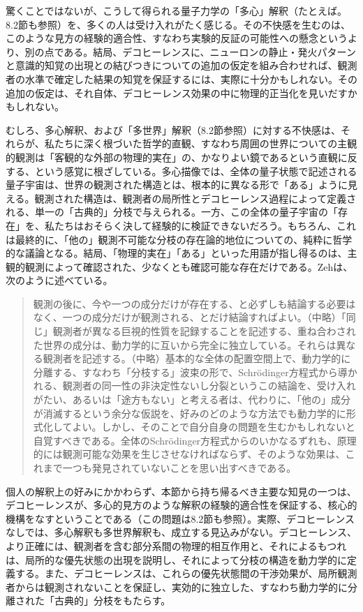 驚くことではないが、こうして得られる量子力学の「多心」解釈（たとえば\cite{ref004,ref005,ref016,ref039,ref067,ref104,ref399,ref523}。8.2節も参照）を、多くの人は受け入れがたく感じる。その不快感を生むのは、このような見方の経験的適合性、すなわち実験的反証の可能性への懸念というより、別の点である。結局、デコヒーレンスに、ニューロンの静止・発火パターンと意識的知覚の出現との結びつきについての追加の仮定を組み合わせれば、観測者の水準で確定した結果の知覚を保証するには、実際に十分かもしれない。その追加の仮定は、それ自体、デコヒーレンス効果の中に物理的正当化を見いだすかもしれない。

むしろ、多心解釈、および「多世界」解釈（8.2節参照）に対する不快感は、それらが、私たちに深く根づいた哲学的直観、すなわち周囲の世界についての主観的観測は「客観的な外部の物理的実在」の、かなりよい鏡であるという直観に反する、という感覚に根ざしている。多心描像では、全体の量子状態で記述される量子宇宙は、世界の観測された構造とは、根本的に異なる形で「ある」ように見える。観測された構造は、観測者の局所性とデコヒーレンス過程によって定義される、単一の「古典的」分枝で与えられる。一方、この全体の量子宇宙の「存在」を、私たちはおそらく決して経験的に検証できないだろう。もちろん、これは最終的に、「他の」観測不可能な分枝の存在論的地位についての、純粋に哲学的な議論となる。結局、「物理的実在」「ある」といった用語が指し得るのは、主観的観測によって確認された、少なくとも確認可能な存在だけである。Zeh\cite{ref408}は、次のように述べている。
\begin{quote}
観測の後に、今や一つの成分だけが存在する、と必ずしも結論する必要はなく、一つの成分だけが観測される、とだけ結論すればよい。（中略）「同じ」観測者が異なる巨視的性質を記録することを記述する、重ね合わされた世界の成分は、動力学的に互いから完全に独立している。それらは異なる観測者を記述する。（中略）基本的な全体の配置空間上で、動力学的に分離する、すなわち「分枝する」波束の形で、Schrödinger方程式から導かれる、観測者の同一性の非決定性ないし分裂というこの結論を、受け入れがたい、あるいは「途方もない」と考える者は、代わりに、「他の」成分が消滅するという余分な仮説を、好みのどのような方法でも動力学的に形式化してよい。しかし、そのことで自分自身の問題を生むかもしれないと自覚すべきである。全体のSchrödinger方程式からのいかなるずれも、原理的には観測可能な効果を生じさせなければならず、そのような効果は、これまで一つも発見されていないことを思い出すべきである。
\end{quote}

\hypertarget{srcpage:378}{}\label{srcpage:378}
個人の解釈上の好みにかかわらず、本節から持ち帰るべき主要な知見の一つは、デコヒーレンスが、多心的見方のような解釈の経験的適合性を保証する、核心的機構をなすということである（この問題は8.2節も参照）。実際、デコヒーレンスなしでは、多心解釈も多世界解釈も、成立する見込みがない。デコヒーレンス、より正確には、観測者を含む部分系間の物理的相互作用と、それによるもつれは、局所的な優先状態の出現を説明し、それによって分枝の構造を動力学的に定義する。また、デコヒーレンスは、これらの優先状態間の干渉効果が、局所観測者からは観測されないことを保証し、実効的に独立した、すなわち動力学的に分離された「古典的」分枝をもたらす。

